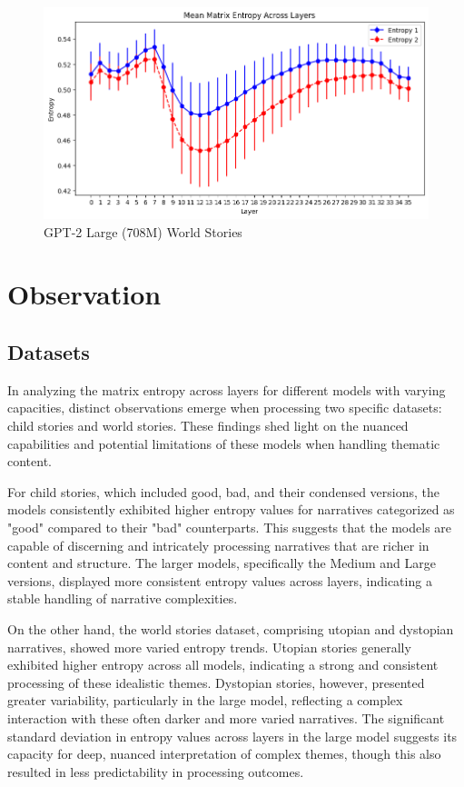 \documentclass{article}
\begin{document}
\begin{figure} [H]
\centering
    \begin{minipage}{0.5\linewidth}
        \includegraphics[width=\linewidth]{Large_World_Stories.png}
        \caption{GPT-2 Large (708M) World Stories}
        \label{fig:large_world_stories}
    \end{minipage}
\end{figure}




\section{Observation}

\subsection{Datasets}
In analyzing the matrix entropy across layers for different models with varying capacities, distinct observations emerge when processing two specific datasets: child stories and world stories. These findings shed light on the nuanced capabilities and potential limitations of these models when handling thematic content.

For child stories, which included good, bad, and their condensed versions, the models consistently exhibited higher entropy values for narratives categorized as "good" compared to their "bad" counterparts. This suggests that the models are capable of discerning and intricately processing narratives that are richer in content and structure. The larger models, specifically the Medium and Large versions, displayed more consistent entropy values across layers, indicating a stable handling of narrative complexities.

On the other hand, the world stories dataset, comprising utopian and dystopian narratives, showed more varied entropy trends. Utopian stories generally exhibited higher entropy across all models, indicating a strong and consistent processing of these idealistic themes. Dystopian stories, however, presented greater variability, particularly in the large model, reflecting a complex interaction with these often darker and more varied narratives. The significant standard deviation in entropy values across layers in the large model suggests its capacity for deep, nuanced interpretation of complex themes, though this also resulted in less predictability in processing outcomes.
\end{document}
